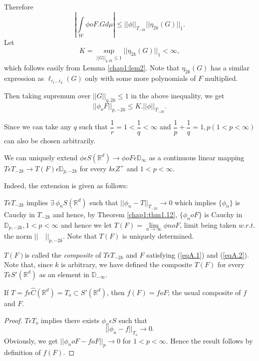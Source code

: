 Therefore\pageoriginale
$$
| \int \limits_W \phi oF.Gd \mu | \le || \phi ||_{T_{-2k}} || \eta_{2k}(G) ||_1.
$$
Let
$$
K = \sup_{|| G ||_{q,2k}\le 1} || \eta_{2k}(G)||_1 < \infty,
$$
which follows easily from Lemma \ref{chap1:lem2}. Note that $\eta_{2
  k}(G)$ has a 
similar expression as $\ell_{i_1\ldots i_k} (G)$ only with some more
polynomials of $F$ multiplied. 

Then taking supremum over $|| G ||_{q, 2k} \le 1$ in the above
inequality, we get  
$$
|| \phi_o F ||_{p, -2k} \le K. || \phi ||_{T_{-2k}}.
$$

Since we can take any $q$ such that $\dfrac{1}{r} = 1 < \dfrac{1}{q} <
\infty$ and $\dfrac{1}{p}+\dfrac{1}{q}= 1,p(1 < p < \infty )$ can also
be chosen arbitrarily. 

\begin{coro*}
  We can uniquely extend $\phi \epsilon  S(\mathbb{R}^d) \to \phi oF
  \epsilon  \mathbb{D}_\infty$ as a continuous linear mapping $T
  \epsilon  T_{-2k} \to T(F) \epsilon  \mathbb{D}_{p,-2k}$ for
  every $k \epsilon  Z^+$ and $1 < p < \infty$. 
\end{coro*}

Indeed, the extension is given as follows:

$T \epsilon  T_{-2k}$ implies $\exists~ \phi_n S(\mathbb{R}^d)$ such
that $ || \phi_n -T ||_{T_{-2k}} \to 0$ which implies $\{\phi_n\}$ is
Cauchy in $T_{-2k}$ and hence, by Theorem \ref{chap1:thm1.12},
$\{\phi_n oF\}$ is 
Cauchy in $\mathbb{D}_{p, -2k}, 1 < p < \infty$ and hence we let
$T(F)= \lim \limits_{n \to \infty} \phi{n}o F$, limit being taken
$w.r.t$. the norm $|| \quad ||_{p, -2k}$. Note that $T(F)$ is uniquely
determined. 

\begin{definition}%
$T(F)$\pageoriginale is called the {\em composite} of $T \epsilon  T_{-2k}$ and
  $F$ satisfying (\ref{eqA.1}) and (\ref{eqA.2}). Note that, since $k$ is
  arbitrary, we have defined the composite $T (F)$ for every $T
  \epsilon  S'(\mathbb{R}^d)$ as an element in $\mathbb{D}_{-
    \infty}$. 
\end{definition}

\setcounter{proposition}{12}
\begin{proposition}%
If $T = f \epsilon  \hat{C} (\mathbb{R}^d)=T_o \subset S'
(\mathbb{R}^d)$, then $f(F)=foF$; the usual composite of $f$ and $F$. 
\end{proposition}

\begin{proof}
$T \epsilon  T_o$ implies there exists $\phi_n \epsilon  S$ such that
$$
|| \phi_n -f ||_{T_o} \to 0.
$$
Obviously, we get $|| \phi_n oF - foF ||_p \to 0$ for $1 < p <
\infty$. Hence the result follows by definition of $f(F)$. 
\end{proof}


